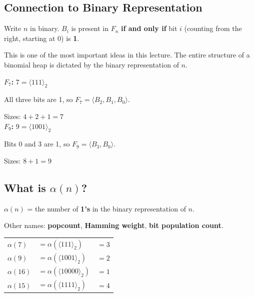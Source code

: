 \documentclass[11pt]{article}
\begin{document}
\subsection{Connection to Binary Representation}

\begin{keybox}
Write $n$ in binary. $B_i$ is present in $F_n$ \textbf{if and only if} bit $i$ (counting from the right, starting at 0) is \textbf{1}.

This is one of the most important ideas in this lecture. The entire structure of a binomial heap is dictated by the binary representation of $n$.
\end{keybox}

\begin{examplebox}
\textbf{$F_7$:} \quad $7 = \langle 111 \rangle_2$

All three bits are 1, so $F_7 = \langle B_2, B_1, B_0 \rangle$.

Sizes: $4 + 2 + 1 = 7$ \checkmark \\[6pt]

\textbf{$F_9$:} \quad $9 = \langle 1001 \rangle_2$

Bits 0 and 3 are 1, so $F_9 = \langle B_3, B_0 \rangle$.

Sizes: $8 + 1 = 9$ \checkmark
\end{examplebox}

\subsection{What is $\alpha(n)$?}

\begin{defbox}
$\alpha(n)$ = the number of \textbf{1's} in the binary representation of $n$.

Other names: \textbf{popcount}, \textbf{Hamming weight}, \textbf{bit population count}.
\end{defbox}

\begin{examplebox}
\begin{center}
\renewcommand{\arraystretch}{1.3}
\begin{tabular}{l l l}
$\alpha(7)$ & $= \alpha(\langle 111 \rangle_2)$ & $= 3$ \\
$\alpha(9)$ & $= \alpha(\langle 1001 \rangle_2)$ & $= 2$ \\
$\alpha(16)$ & $= \alpha(\langle 10000 \rangle_2)$ & $= 1$ \\
$\alpha(15)$ & $= \alpha(\langle 1111 \rangle_2)$ & $= 4$ \\
\end{tabular}
\end{center}
\end{examplebox}
\end{document}
